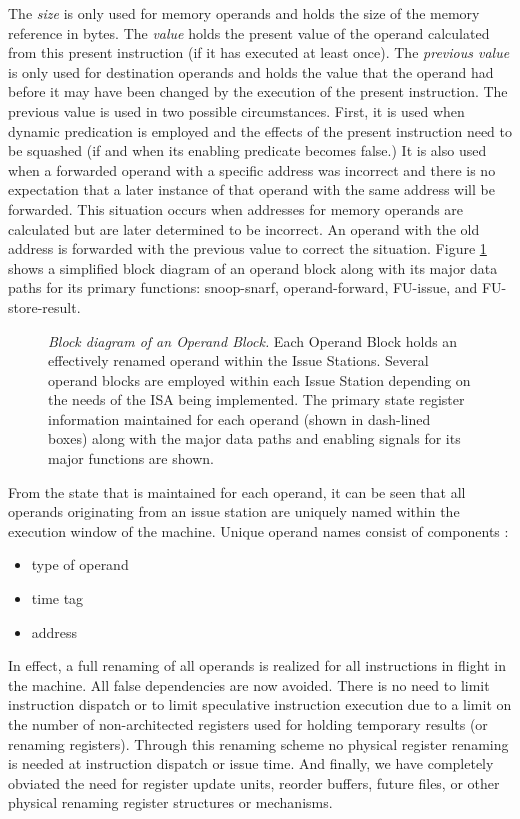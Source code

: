 \documentclass[10pt,dvips]{article}
\begin{document}
The \textit{size} is only used for memory operands and holds
the size of the memory reference in bytes.
The \textit{value} holds the present value of the operand
calculated from this present instruction (if it has executed
at least once).
The \textit{previous value} is only used for destination
operands and holds the value that the operand
had before it may have been changed by the execution of 
the present instruction.
The previous value is used in two possible circumstances.
First, it is used when dynamic predication is
employed and the effects of the present instruction need to be
squashed (if and when its enabling predicate becomes false.)
It is also used when a forwarded operand with a specific
address was incorrect 
and there is no expectation that a later instance
of that operand with the same address will be forwarded.
This situation occurs when addresses for memory operands are
calculated but are later determined to be incorrect.
An operand with the old address is forwarded with the previous
value to correct the situation.
Figure \ref{fig:operand} shows a simplified block diagram of
an operand block along with its major data paths for its
primary functions: snoop-snarf, operand-forward, FU-issue,
and FU-store-result.
%
\begin{figure}
\centering
\scriptsize {
}
\caption{{\em Block diagram of an Operand Block.} 
Each Operand Block holds an effectively renamed 
operand within the Issue Stations.
Several operand blocks are employed within each Issue Station
depending on the needs of the ISA being implemented.
The primary state register information maintained for each operand (shown in
dash-lined boxes)
along with the major data paths and enabling signals for
its major functions are shown.}
\label{fig:operand}
\end{figure}
%

From the state that is maintained for each operand, it can be seen
that all operands originating from an issue station
are uniquely named within the
execution window of the machine.
Unique operand names consist of components :
%
\begin{itemize}
\vspace{-0.10in}
\item{type of operand}
\vspace{-0.10in}
\item{time tag}
\vspace{-0.10in}
\item{address}
\vspace{-0.10in}
\end{itemize}   
%
In effect, a full renaming of
all operands is realized for all instructions
in flight in the machine.  
All false dependencies are now avoided.
There is no need to limit instruction dispatch or to limit speculative
instruction execution due to a limit on the number of non-architected
registers used for holding temporary results (or renaming registers).
Through this renaming scheme
no physical register renaming is needed at instruction dispatch
or issue time.  
And finally, we have completely obviated the need for
register update units, reorder buffers, future files, or other physical 
renaming register structures or mechanisms.
%
%
\end{document}
